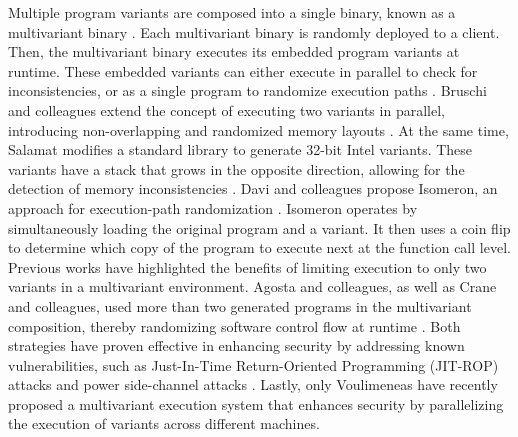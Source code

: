 \begin{strategy}
    Multiple program variants are composed into a single binary, known as a multivariant binary \cite{cox06}. 
    Each multivariant binary is randomly deployed to a client.
    Then, the multivariant binary executes its embedded program variants at runtime. 
    These embedded variants can either execute in parallel to check for inconsistencies, or as a single program to randomize execution paths \cite{bhatkar03}. 
    Bruschi and colleagues extend the concept of executing two variants in parallel, introducing non-overlapping and randomized memory layouts \cite{bruschi2007diversified}. 
    At the same time, Salamat \etal modifies a standard library to generate 32-bit Intel variants. 
    These variants have a stack that grows in the opposite direction, allowing for the detection of memory inconsistencies \cite{salamat2007stopping}. 
    Davi and colleagues propose Isomeron, an approach for execution-path randomization \cite{davi2015isomeron}. 
    Isomeron operates by simultaneously loading the original program and a variant. 
    It then uses a coin flip to determine which copy of the program to execute next at the function call level. 
    Previous works have highlighted the benefits of limiting execution to only two variants in a multivariant environment. 
    Agosta and colleagues, as well as Crane and colleagues, used more than two generated programs in the multivariant composition, thereby randomizing software control flow at runtime \cite{agosta2015meet, crane2015thwarting}. 
    Both strategies have proven effective in enhancing security by addressing known vulnerabilities, such as Just-In-Time Return-Oriented Programming (JIT-ROP) attacks \cite{jackson2011compiler} and power side-channel attacks \cite{amarilli2011can}. 
    Lastly, only Voulimeneas \etal \cite{voulimeneas2021dmvx} have recently proposed a multivariant execution system that enhances security by parallelizing the execution of variants across different machines.
\end{strategy}




